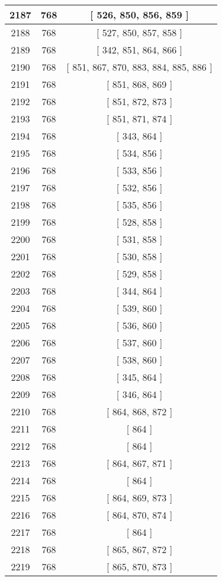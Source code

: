 \begin{center}
\begin{longtable}[H]{|| c c c ||}
\hline
2187 & 768 & [ 526, 850, 856, 859 ] \\ 
\hline
2188 & 768 & [ 527, 850, 857, 858 ] \\ 
\hline
2189 & 768 & [ 342, 851, 864, 866 ] \\ 
\hline
2190 & 768 & [ 851, 867, 870, 883, 884, 885, 886 ] \\ 
\hline
2191 & 768 & [ 851, 868, 869 ] \\ 
\hline
2192 & 768 & [ 851, 872, 873 ] \\ 
\hline
2193 & 768 & [ 851, 871, 874 ] \\ 
\hline
2194 & 768 & [ 343, 864 ] \\ 
\hline
2195 & 768 & [ 534, 856 ] \\ 
\hline
2196 & 768 & [ 533, 856 ] \\ 
\hline
2197 & 768 & [ 532, 856 ] \\ 
\hline
2198 & 768 & [ 535, 856 ] \\ 
\hline
2199 & 768 & [ 528, 858 ] \\ 
\hline
2200 & 768 & [ 531, 858 ] \\ 
\hline
2201 & 768 & [ 530, 858 ] \\ 
\hline
2202 & 768 & [ 529, 858 ] \\ 
\hline
2203 & 768 & [ 344, 864 ] \\ 
\hline
2204 & 768 & [ 539, 860 ] \\ 
\hline
2205 & 768 & [ 536, 860 ] \\ 
\hline
2206 & 768 & [ 537, 860 ] \\ 
\hline
2207 & 768 & [ 538, 860 ] \\ 
\hline
2208 & 768 & [ 345, 864 ] \\ 
\hline
2209 & 768 & [ 346, 864 ] \\ 
\hline
2210 & 768 & [ 864, 868, 872 ] \\ 
\hline
2211 & 768 & [ 864 ] \\ 
\hline
2212 & 768 & [ 864 ] \\ 
\hline
2213 & 768 & [ 864, 867, 871 ] \\ 
\hline
2214 & 768 & [ 864 ] \\ 
\hline
2215 & 768 & [ 864, 869, 873 ] \\ 
\hline
2216 & 768 & [ 864, 870, 874 ] \\ 
\hline
2217 & 768 & [ 864 ] \\ 
\hline
2218 & 768 & [ 865, 867, 872 ] \\ 
\hline
2219 & 768 & [ 865, 870, 873 ] \\ 

\end{longtable}
\end{center}
